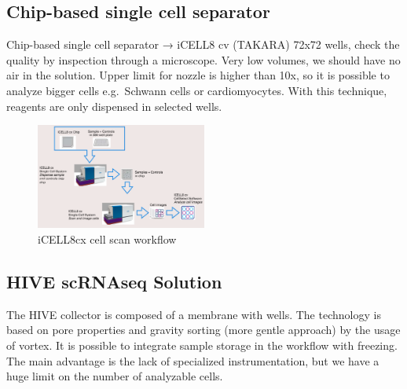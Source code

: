 \hypertarget{chip-based-single-cell-separator}{%
\subsection{Chip-based single cell
separator}\label{chip-based-single-cell-separator}}

Chip-based single cell separator → iCELL8 cv (TAKARA) 72x72 wells, check
the quality by inspection through a microscope. Very low volumes, we
should have no air in the solution. Upper limit for nozzle is higher
than 10x, so it is possible to analyze bigger cells e.g.~Schwann cells
or cardiomyocytes. With this technique, reagents are only dispensed in
selected wells.

\begin{figure}
\centering
\includegraphics[width=0.5\textwidth]{images/Screenshot_9.png}
\caption{iCELL8cx cell scan workflow}
\end{figure}

\hypertarget{hive-scrnaseq-solution}{%
\subsection{HIVE scRNAseq
Solution}\label{hive-scrnaseq-solution}}

The HIVE collector is composed of a membrane with wells. The technology
is based on pore properties and gravity sorting (more gentle approach)
by the usage of vortex. It is possible to integrate sample storage in
the workflow with freezing. The main advantage is the lack of
specialized instrumentation, but we have a huge limit on the number of
analyzable cells.
